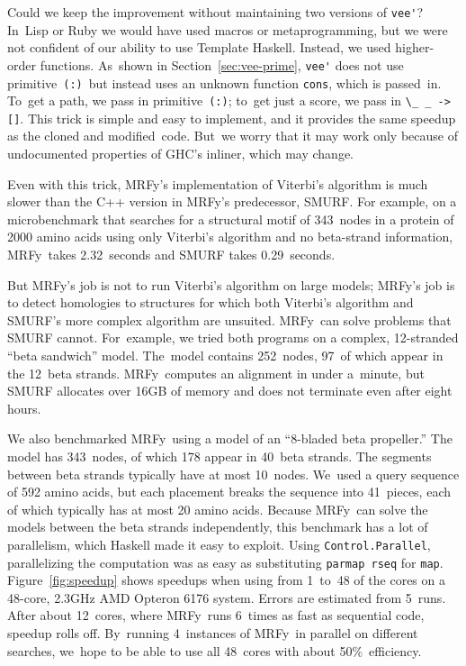 \documentclass[]{jfp1}
\newcommand\mrfy{MRFy} %
\newcommand\primcons{\texttt{\small(:)}}
\newcommand\figref[1]{Figure~\ref{fig:#1}}
\newcommand\secref[1]{Section~\ref{sec:#1}}
\begin{document}
Could we keep the improvement without 
maintaining two versions of \verb+vee'+?
In~Lisp or Ruby we would have used macros or metaprogramming,
but we were not confident of our ability to use Template Haskell.
Instead, we used higher-order functions.
As~shown in \secref{vee-prime},
\verb+vee'+ does not use primitive~\primcons\ but instead
uses an unknown function \texttt{cons}, which is
passed~in.
To~get a path, we pass in primitive~\primcons;
to~get just a score, we pass in
\verb+\_ _ -> []+.
This trick is simple and easy to implement, and it provides the same
speedup as the cloned and modified~code.
But~we worry that it may work only because of
undocumented properties of GHC's inliner, which may 
change.

Even with this trick,
MRFy's implementation of Viterbi's algorithm is much
slower than the C++ version in \mrfy's predecessor,
SMURF.
\ifpagetuning\vadjust{\break}\fi
For example, on a microbenchmark that searches for a
structural motif of 343~nodes in a protein of 2000 amino acids
using only Viterbi's algorithm and no beta-strand information,
\mrfy\ takes 2.32~seconds and
SMURF takes 0.29~seconds.

But \mrfy's job is not to run Viterbi's algorithm on large models;
\mrfy's job is to detect homologies to structures for which both Viterbi's
algorithm and SMURF's more complex algorithm are unsuited.
\mrfy\ can solve problems that SMURF cannot.
For~example, we tried both programs on a complex, 12-stranded ``beta
sandwich'' 
model.
The~model contains 252~nodes,
97~of which appear in the 12~beta strands.
\mrfy\ computes an alignment in under a~minute,
but SMURF allocates
over 16GB of memory and does not terminate even after eight hours.

We also benchmarked \mrfy\ using a model of an ``8-bladed beta propeller.''
The model has 343~nodes, of which 178 appear in 40~beta strands.
The segments between beta strands typically have at most 10~nodes.
We~used a query sequence of 592 amino acids, but each placement breaks
the sequence into 41~pieces, each of which typically has at most 20 amino
acids.
Because \mrfy\ can solve the models between the beta strands independently,
this benchmark has a lot of parallelism,
which Haskell made it easy to exploit.
Using
\texttt{Control.Parallel}, parallelizing the computation was as easy
as  substituting
\texttt{parmap rseq} for \texttt{map}.
\figref{speedup} shows speedups when using from 
 1~to~48 of the cores 
on a 48-core, 2.3GHz AMD Opteron 6176 system.
Errors are estimated from 5~runs.
After about 12~cores, where \mrfy\ runs 6~times as fast as sequential
code, speedup rolls off.
By~running 4~instances of \mrfy\ in parallel on different searches,
we~hope to be able to use all 48~cores with about 50\%~efficiency.
\end{document}
